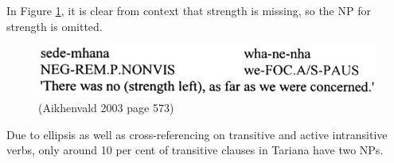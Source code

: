 \documentclass{article}
\begin{document}
\noindent In Figure \ref*{strengthleft}, it is clear from context that strength is missing, so the NP for strength is omitted.

\begin{figure}[h!]
  \centering
  \includegraphics[scale = 0.42]{strengthleft.png}
    \caption{(Aikhenvald 2003 page 573)}
    \label{strengthleft}
\end{figure}

\noindent Due to ellipsis as well as cross-referencing on transitive and active intransitive verbs, only around 10 per cent of transitive clauses in Tariana have two NPs.

\end{document}
